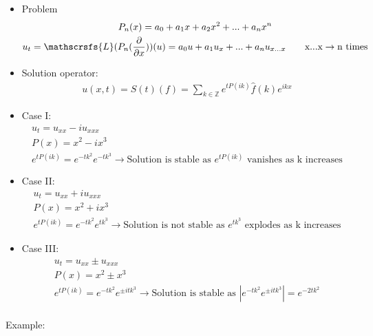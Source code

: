 \documentclass[12pt, a4paper]{article}
\begin{document}
\begin{itemize}
    \item Problem
    \begin{gather*}
        P_n(x) = a_0 + a_1x + a_2x^2 + ... + a_nx^n \\
        u_t = \mathscrsfs{L}(P_n(\frac{\partial}{\partial x}))(u) = a_0u + a_1u_x + ... + a_n u_{x...x} \qquad \text{x...x} \rightarrow \text{n times}
    \end{gather*}
    \item Solution operator:
    \begin{gather*}
        u(x, t) = S(t)(f) =\sum_{k \in \mathbb{Z}} e^{tP(ik)}\hat{f}(k)e^{ikx}
    \end{gather*}
    \item Case I:
    \begin{gather*}
        u_t = u_{xx} - iu_{xxx}\\
        P(x) = x^2 - ix^3\\
        e^{tP(ik)} = e^{-tk^2}e^{-tk^3} \rightarrow \text{Solution is stable as $e^{tP(ik)}$ vanishes as k increases}
    \end{gather*}
    \item Case II:
    \begin{gather*}
        u_t = u_{xx} + iu_{xxx}\\
        P(x) = x^2 + ix^3\\
        e^{tP(ik)} = e^{-tk^2}e^{tk^3} \rightarrow \text{Solution is not stable as $e^{tk^3}$ explodes as k increases}
    \end{gather*}
    \item Case III:
    \begin{gather*}
        u_t = u_{xx} \pm u_{xxx}\\
        P(x) = x^2 \pm x^3\\
        e^{tP(ik)} = e^{-tk^2}e^{\pm itk^3} \rightarrow \text{Solution is stable as $|e^{-tk^2}e^{\pm itk^3}| = e^{-2tk^2}$} \\
    \end{gather*}
\end{itemize}
Example:
\end{document}
